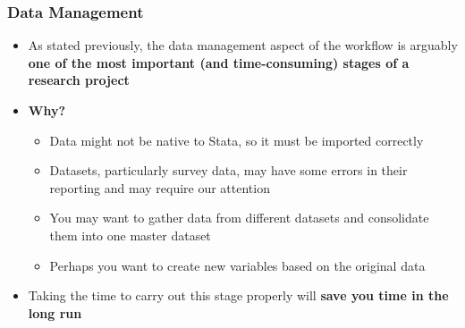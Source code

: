 \documentclass[10pt, compress]{beamer}
\begin{document}
\begin{frame}[fragile]
\frametitle{Data Management}
\begin{itemize}
\item As stated previously, the data management aspect of the workflow is arguably \textbf{one of the most important (and time-consuming) stages of a research project}
\item \textbf{Why?}
\begin{itemize}
\item Data \alert{might not be native to Stata}, so it must be imported correctly
\item Datasets, particularly survey data, may have some \alert{errors in their reporting and may require our attention}
\item You may want to gather data from different datasets and \alert{consolidate them into one master dataset}
\item Perhaps you want to \alert{create new variables} based on the original data
\end{itemize}
\item Taking the time to carry out this stage properly will \textbf{save you time in the long run}
\end{itemize}
\end{frame}
\end{document}
